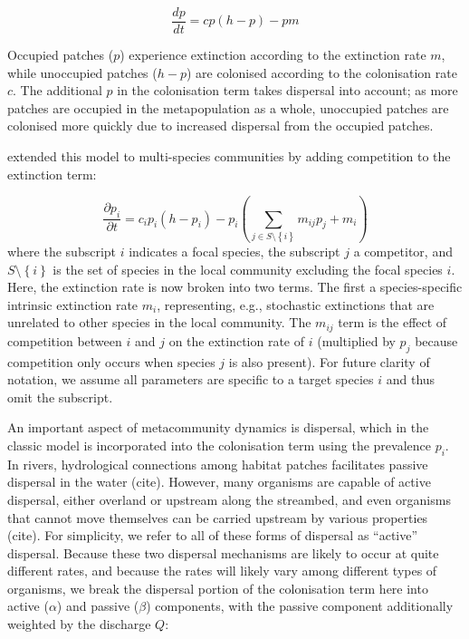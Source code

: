 \documentclass[11pt,a4paper]{article}
\begin{document}
\begin{equation}
	\frac{dp}{dt} = cp \left( h - p \right) - pm \label{eq:levins}
\end{equation}

Occupied patches ($p$) experience extinction according to the extinction rate $m$, while unoccupied patches ($h-p$) are colonised according to the colonisation rate $c$. 
The additional $p$ in the colonisation term takes dispersal into account; as more patches are occupied in the metapopulation as a whole, unoccupied patches are colonised more quickly due to increased dispersal from the occupied patches.

\textcite{Hunt2009} extended this model to multi-species communities by adding competition to the extinction term:

\begin{equation}
	\frac{\partial p_i}{\partial t} = c_i p_i \left( h-p_i \right) - p_i \left( \sum_{j \in S \setminus \left\{i \right\} }{m_{ij}p_j} + m_i \right) \label{eq:hunt}
\end{equation}
where the subscript $i$ indicates a focal species, the subscript $j$ a competitor, and $S \setminus \left\{i \right\}$ is the set of species in the local community excluding the focal species $i$.
Here, the extinction rate is now broken into two terms.
The first a species-specific intrinsic extinction rate $m_i$, representing, e.g., stochastic extinctions that are unrelated to other species in the local community.
The $m_{ij}$ term is the effect of competition between $i$ and $j$ on the extinction rate of $i$ (multiplied by $p_j$ because competition only occurs when species $j$ is also present).
For future clarity of notation, we assume all parameters are specific to a target species $i$ and thus omit the subscript.

An important aspect of metacommunity dynamics is dispersal, which in the classic model is incorporated into the colonisation term using the prevalence $p_i$.
In rivers, hydrological connections among habitat patches facilitates passive dispersal in the water (cite).
However, many organisms are capable of active dispersal, either overland or upstream along the streambed, and even organisms that cannot move themselves can be carried upstream by various properties (cite).
For simplicity, we refer to all of these forms of dispersal as “active” dispersal.
Because these two dispersal mechanisms are likely to occur at quite different rates, and because the rates will likely vary among different types of organisms, we break the dispersal portion of the colonisation term here into active ($\alpha$) and passive ($\beta$) components, with the passive component additionally weighted by the discharge $Q$:
\end{document}
